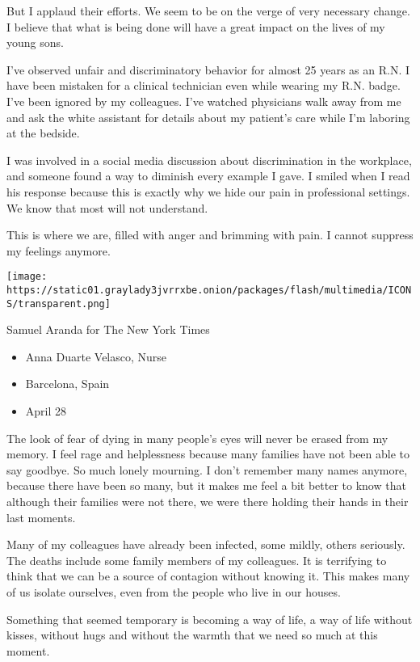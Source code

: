 But I applaud their efforts. We seem to be on the verge of very
necessary change. I believe that what is being done will have a great
impact on the lives of my young sons.

I've observed unfair and discriminatory behavior for almost 25 years as
an R.N. I have been mistaken for a clinical technician even while
wearing my R.N. badge. I've been ignored by my colleagues. I've watched
physicians walk away from me and ask the white assistant for details
about my patient's care while I'm laboring at the bedside.

I was involved in a social media discussion about discrimination in the
workplace, and someone found a way to diminish every example I gave. I
smiled when I read his response because this is exactly why we hide our
pain in professional settings. We know that most will not understand.

This is where we are, filled with anger and brimming with pain. I cannot
suppress my feelings anymore.

\texttt{[image: https://static01.graylady3jvrrxbe.onion/packages/flash/multimedia/ICONS/transparent.png]}

Samuel Aranda for The New York Times

\begin{itemize}
\tightlist
\item
  Anna Duarte Velasco, Nurse
\item
  Barcelona, Spain
\item
  April 28
\end{itemize}

The look of fear of dying in many people's eyes will never be erased
from my memory. I feel rage and helplessness because many families have
not been able to say goodbye. So much lonely mourning. I don't remember
many names anymore, because there have been so many, but it makes me
feel a bit better to know that although their families were not there,
we were there holding their hands in their last moments.

Many of my colleagues have already been infected, some mildly, others
seriously. The deaths include some family members of my colleagues. It
is terrifying to think that we can be a source of contagion without
knowing it. This makes many of us isolate ourselves, even from the
people who live in our houses.

Something that seemed temporary is becoming a way of life, a way of life
without kisses, without hugs and without the warmth that we need so much
at this moment.

